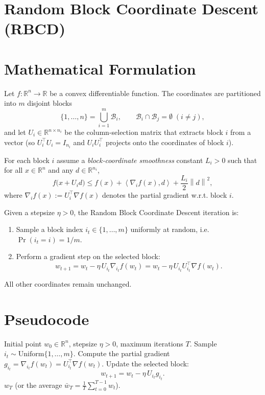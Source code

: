 \documentclass{article}
\newcommand{\R}{\mathbb{R}}
\newcommand{\norm}[1]{\left\|#1\right\|}
\newcommand{\ip}[2]{\left\langle #1,#2\right\rangle}
\newcommand{\block}[1]{\mathcal{B}_{#1}}
\begin{document}
\section*{Random Block Coordinate Descent (RBCD)}

\section*{Mathematical Formulation}
Let $f:\R^{n}\to\R$ be a convex differentiable function.  
The coordinates are partitioned into $m$ disjoint blocks  
\[
\{1,\dots ,n\}=\bigcup_{i=1}^{m}\block{i},\qquad 
\block{i}\cap\block{j}=\emptyset\;(i\neq j),
\]
and let $U_i\in\R^{n\times n_i}$ be the column‑selection matrix that extracts block $i$ from a vector (so $U_i^{\top}U_i=I_{n_i}$ and $U_iU_i^{\top}$ projects onto the coordinates of block $i$).

For each block $i$ assume a \emph{block‑coordinate smoothness} constant $L_i>0$ such that for all $x\in\R^{n}$ and any $d\in\R^{n_i}$,
\begin{equation}
\label{eq:smooth}
f\bigl(x+U_i d\bigr)\le 
f(x)+\ip{\nabla_i f(x)}{d}+\frac{L_i}{2}\norm{d}^{2},
\end{equation}
where $\nabla_i f(x):=U_i^{\top}\nabla f(x)$ denotes the partial gradient w.r.t. block $i$.

Given a stepsize $\eta>0$, the Random Block Coordinate Descent iteration is:
\begin{enumerate}[label=(\roman*)]
\item Sample a block index $i_t\in\{1,\dots ,m\}$ uniformly at random,
      i.e. $\Pr(i_t=i)=1/m$.
\item Perform a gradient step on the selected block:
\begin{equation}
\label{eq:update}
w_{t+1}=w_t-\eta\,U_{i_t}\nabla_{i_t} f(w_t)
      =w_t-\eta\,U_{i_t}U_{i_t}^{\top}\nabla f(w_t).
\end{equation}
\end{enumerate}
All other coordinates remain unchanged.

\section*{Pseudocode}
\begin{algorithm}[H]
\caption{Random Block Coordinate Descent}
\label{alg:rbcd}
\begin{algorithmic}[1]
\REQUIRE Initial point $w_0\in\R^{n}$, stepsize $\eta>0$, maximum iterations $T$.
    \STATE Sample $i_t\sim\text{Uniform}\{1,\dots ,m\}$.
    \STATE Compute the partial gradient $\displaystyle g_{i_t}= \nabla_{i_t}f(w_t)=U_{i_t}^{\top}\nabla f(w_t)$.
    \STATE Update the selected block:
    \[
    w_{t+1}= w_t-\eta\,U_{i_t} g_{i_t}.
    \]
\ENDFOR
\RETURN $w_T$ (or the average $\bar w_T=\frac1T\sum_{t=0}^{T-1}w_t$).
\end{algorithmic}
\end{algorithm}
\end{document}

